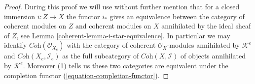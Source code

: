 \begin{proof}

During this proof we will use without further mention that for a closed
immersion $i : Z \to X$ the functor $i_*$ gives an equivalence between the
category of coherent modules on $Z$ and coherent modules on $X$ annihilated
by the ideal sheaf of $Z$, see Lemma \ref{coherent-lemma-i-star-equivalence}.
In particular we may identify $\textit{Coh}(\mathcal{O}_{X_e})$
with the category of coherent $\mathcal{O}_X$-modules annihilated by
$\mathcal{K}^e$ and $\textit{Coh}(X_e, \mathcal{I}_e)$ as the full subcategory
of $\textit{Coh}(X, \mathcal{I})$ of objects annihilated by $\mathcal{K}^e$.
Moreover (1) tells us these two categories are equivalent under the
completion functor (\ref{equation-completion-functor}).


\end{proof}
